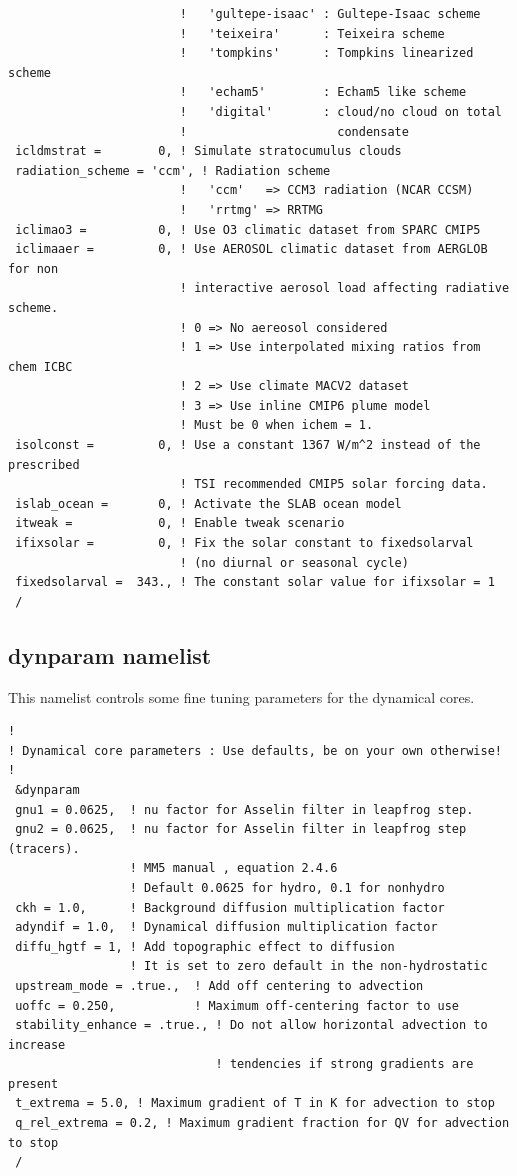 {\begin{Verbatim}
                        !   'gultepe-isaac' : Gultepe-Isaac scheme
                        !   'teixeira'      : Teixeira scheme
                        !   'tompkins'      : Tompkins linearized scheme
                        !   'echam5'        : Echam5 like scheme
                        !   'digital'       : cloud/no cloud on total
                        !                     condensate
 icldmstrat =        0, ! Simulate stratocumulus clouds
 radiation_scheme = 'ccm', ! Radiation scheme
                        !   'ccm'   => CCM3 radiation (NCAR CCSM)
                        !   'rrtmg' => RRTMG
 iclimao3 =          0, ! Use O3 climatic dataset from SPARC CMIP5
 iclimaaer =         0, ! Use AEROSOL climatic dataset from AERGLOB for non
                        ! interactive aerosol load affecting radiative scheme.
                        ! 0 => No aereosol considered
                        ! 1 => Use interpolated mixing ratios from chem ICBC
                        ! 2 => Use climate MACV2 dataset
                        ! 3 => Use inline CMIP6 plume model
                        ! Must be 0 when ichem = 1.
 isolconst =         0, ! Use a constant 1367 W/m^2 instead of the prescribed
                        ! TSI recommended CMIP5 solar forcing data.
 islab_ocean =       0, ! Activate the SLAB ocean model
 itweak =            0, ! Enable tweak scenario
 ifixsolar =         0, ! Fix the solar constant to fixedsolarval
                        ! (no diurnal or seasonal cycle)
 fixedsolarval =  343., ! The constant solar value for ifixsolar = 1
 /
\end{Verbatim}
}

\subsection{dynparam namelist}
\label{dynparam}

This namelist controls some fine tuning parameters for the dynamical cores.

{\footnotesize
\begin{Verbatim}
!
! Dynamical core parameters : Use defaults, be on your own otherwise!
!
 &dynparam
 gnu1 = 0.0625,  ! nu factor for Asselin filter in leapfrog step.
 gnu2 = 0.0625,  ! nu factor for Asselin filter in leapfrog step (tracers).
                 ! MM5 manual , equation 2.4.6
                 ! Default 0.0625 for hydro, 0.1 for nonhydro
 ckh = 1.0,      ! Background diffusion multiplication factor
 adyndif = 1.0,  ! Dynamical diffusion multiplication factor
 diffu_hgtf = 1, ! Add topographic effect to diffusion
                 ! It is set to zero default in the non-hydrostatic
 upstream_mode = .true.,  ! Add off centering to advection
 uoffc = 0.250,           ! Maximum off-centering factor to use
 stability_enhance = .true., ! Do not allow horizontal advection to increase
                             ! tendencies if strong gradients are present
 t_extrema = 5.0, ! Maximum gradient of T in K for advection to stop
 q_rel_extrema = 0.2, ! Maximum gradient fraction for QV for advection to stop
 /
\end{Verbatim}
}

